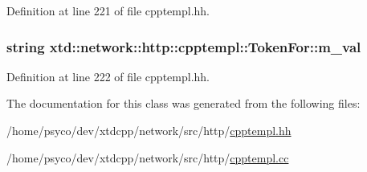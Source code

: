 Definition at line 221 of file cpptempl.\+hh.

\subsubsection[{\texorpdfstring{m\+\_\+val}{m_val}}]{\setlength{\rightskip}{0pt plus 5cm}string xtd\+::network\+::http\+::cpptempl\+::\+Token\+For\+::m\+\_\+val}\hypertarget{classxtd_1_1network_1_1http_1_1cpptempl_1_1TokenFor_a262fbad437a0b5aeed05a73c315f865b}{}\label{classxtd_1_1network_1_1http_1_1cpptempl_1_1TokenFor_a262fbad437a0b5aeed05a73c315f865b}


Definition at line 222 of file cpptempl.\+hh.



The documentation for this class was generated from the following files\+:\begin{DoxyCompactItemize}
\item 
/home/psyco/dev/xtdcpp/network/src/http/\hyperlink{cpptempl_8hh}{cpptempl.\+hh}\item 
/home/psyco/dev/xtdcpp/network/src/http/\hyperlink{cpptempl_8cc}{cpptempl.\+cc}\end{DoxyCompactItemize}
